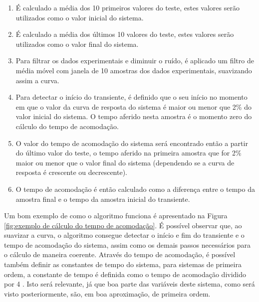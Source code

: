 \begin{enumerate}   
    \item É calculado a média dos 10 primeiros valores do teste, estes valores serão utilizados como o valor inicial do sistema.
    \item É calculado a média dos últimos 10 valores do teste, estes valores serão utilizados como o valor final do sistema.
    \item Para filtrar os dados experimentais e diminuir o ruído, é aplicado um filtro de média móvel com janela de 10 amostras dos dados experimentais, suavizando assim a curva.
    \item Para detectar o início do transiente, é definido que o seu início no momento em que o valor da curva de resposta do sistema é maior ou menor que 2\% do valor inicial do sistema. O tempo aferido nesta amostra é o momento zero do cálculo do tempo de acomodação.
    \item O valor do tempo de acomodação do sistema será encontrado então a partir do último valor do teste, o tempo aferido na primeira amostra que for 2\% maior ou menor que o valor final do sistema (dependendo se a curva de resposta é crescente ou decrescente).
    \item O tempo de acomodação é então calculado como a diferença entre o tempo da amostra final e o tempo da amostra inicial do transiente.
\end{enumerate}

Um bom exemplo de como o algoritmo funciona é apresentado na Figura \ref{fig:exemplo de cálculo do tempo de acomodação}. É possível observar que, ao suavizar a curva, o algoritmo consegue detectar o início e fim do transiente e o tempo de acomodação do sistema, assim como os demais passos necessários para o cálculo de maneira coerente. Através do tempo de acomodação, é possível também definir as constantes de tempo do sistema, para sistemas de primeira ordem, a constante de tempo é definida como o tempo de acomodação dividido por 4 \cite{ogataControle}. Isto será relevante, já que boa parte das variáveis deste sistema, como será visto posteriormente, são, em boa aproximação, de primeira ordem.

